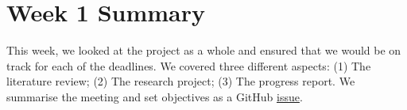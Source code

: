 \documentclass{article}
\begin{document}
\section*{Week 1 Summary}

\vspace{0.5cm}

This week, we looked at the project as a whole and ensured that we would be on track for each of the deadlines. We covered three different aspects: (1) The literature review; (2) The research project; (3) The progress report. We summarise the meeting and set objectives as a GitHub \href{https://github.com/rowan-adeya/masters-project/issues/1}{issue}.
\end{document}
